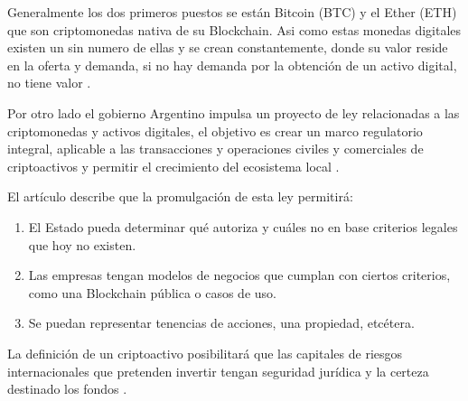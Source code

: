 
Generalmente los  dos primeros puestos se están Bitcoin (BTC) y el Ether (ETH) que son criptomonedas nativa de su Blockchain. 
Asi como estas monedas digitales existen un sin numero de ellas y se crean constantemente, donde su valor reside en la oferta y demanda,
si no hay demanda por la obtención de un activo digital, no tiene valor \cite[]{joaquin_lopez_lerida_economiBlockchain_2016}.

Por otro lado el gobierno Argentino impulsa un proyecto de ley relacionadas a las criptomonedas y activos digitales,
el objetivo es crear un marco regulatorio integral, aplicable a las transacciones y operaciones civiles y 
comerciales de criptoactivos  y permitir
el crecimiento del ecosistema local  \cite[]{dagostino_exclusivo_nodate}.


El artículo \cite[]{dagostino_exclusivo_nodate} describe que la promulgación de esta ley permitirá:
\begin{enumerate}
    \item El Estado pueda determinar qué  autoriza y cuáles no en base criterios legales que hoy no existen.

    \item Las empresas tengan modelos de negocios que cumplan con ciertos criterios, como una  Blockchain pública o casos de uso.

    \item Se puedan representar tenencias de acciones, una propiedad, etcétera.

\end{enumerate}


La definición de un criptoactivo posibilitará que las capitales de riesgos internacionales 
que pretenden invertir tengan  seguridad jurídica y la certeza destinado los fondos \cite[]{dagostino_exclusivo_nodate}. 


